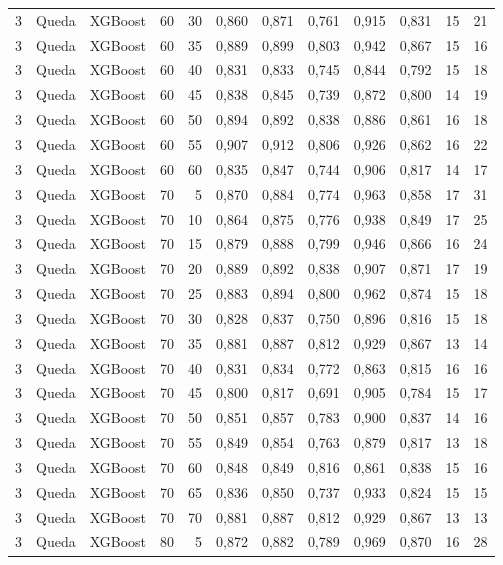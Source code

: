 \begin{longtable}{@{}rllrrrrrrrrr@{}}
3 & Queda & XGBoost & 60 & 30 & 0,860 & 0,871 & 0,761 & 0,915 & 0,831 & 15 & 21 \\
3 & Queda & XGBoost & 60 & 35 & 0,889 & 0,899 & 0,803 & 0,942 & 0,867 & 15 & 16 \\
3 & Queda & XGBoost & 60 & 40 & 0,831 & 0,833 & 0,745 & 0,844 & 0,792 & 15 & 18 \\
3 & Queda & XGBoost & 60 & 45 & 0,838 & 0,845 & 0,739 & 0,872 & 0,800 & 14 & 19 \\
3 & Queda & XGBoost & 60 & 50 & 0,894 & 0,892 & 0,838 & 0,886 & 0,861 & 16 & 18 \\
3 & Queda & XGBoost & 60 & 55 & 0,907 & 0,912 & 0,806 & 0,926 & 0,862 & 16 & 22 \\
3 & Queda & XGBoost & 60 & 60 & 0,835 & 0,847 & 0,744 & 0,906 & 0,817 & 14 & 17 \\
3 & Queda & XGBoost & 70 & 5 & 0,870 & 0,884 & 0,774 & 0,963 & 0,858 & 17 & 31 \\
3 & Queda & XGBoost & 70 & 10 & 0,864 & 0,875 & 0,776 & 0,938 & 0,849 & 17 & 25 \\
3 & Queda & XGBoost & 70 & 15 & 0,879 & 0,888 & 0,799 & 0,946 & 0,866 & 16 & 24 \\
3 & Queda & XGBoost & 70 & 20 & 0,889 & 0,892 & 0,838 & 0,907 & 0,871 & 17 & 19 \\
3 & Queda & XGBoost & 70 & 25 & 0,883 & 0,894 & 0,800 & 0,962 & 0,874 & 15 & 18 \\
3 & Queda & XGBoost & 70 & 30 & 0,828 & 0,837 & 0,750 & 0,896 & 0,816 & 15 & 18 \\
3 & Queda & XGBoost & 70 & 35 & 0,881 & 0,887 & 0,812 & 0,929 & 0,867 & 13 & 14 \\
3 & Queda & XGBoost & 70 & 40 & 0,831 & 0,834 & 0,772 & 0,863 & 0,815 & 16 & 16 \\
3 & Queda & XGBoost & 70 & 45 & 0,800 & 0,817 & 0,691 & 0,905 & 0,784 & 15 & 17 \\
3 & Queda & XGBoost & 70 & 50 & 0,851 & 0,857 & 0,783 & 0,900 & 0,837 & 14 & 16 \\
3 & Queda & XGBoost & 70 & 55 & 0,849 & 0,854 & 0,763 & 0,879 & 0,817 & 13 & 18 \\
3 & Queda & XGBoost & 70 & 60 & 0,848 & 0,849 & 0,816 & 0,861 & 0,838 & 15 & 16 \\
3 & Queda & XGBoost & 70 & 65 & 0,836 & 0,850 & 0,737 & 0,933 & 0,824 & 15 & 15 \\
3 & Queda & XGBoost & 70 & 70 & 0,881 & 0,887 & 0,812 & 0,929 & 0,867 & 13 & 13 \\
3 & Queda & XGBoost & 80 & 5 & 0,872 & 0,882 & 0,789 & 0,969 & 0,870 & 16 & 28 \\

\end{longtable}

